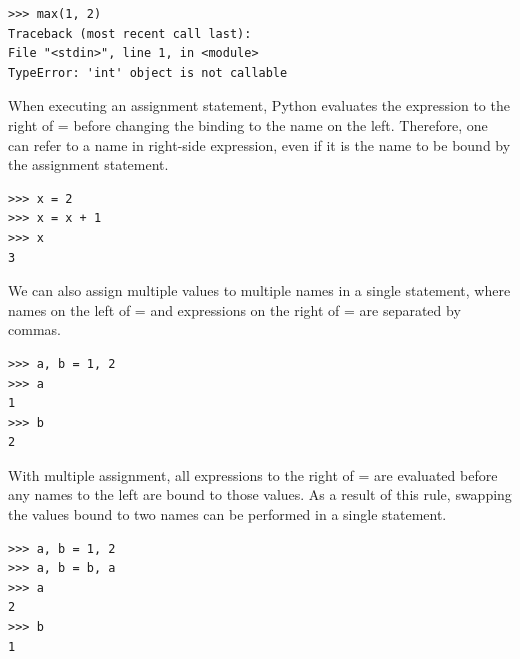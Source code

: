 \documentclass[11pt]{article}
\begin{document}
\begin{lstlisting}
>>> max(1, 2)
Traceback (most recent call last):
File "<stdin>", line 1, in <module>
TypeError: 'int' object is not callable 
\end{lstlisting}
When executing an assignment statement, Python evaluates the expression to the right of = before changing the binding to the name on the left. Therefore, one can refer to a name in right-side expression, even if it is the name to be bound by the assignment statement. 
\begin{lstlisting}
>>> x = 2
>>> x = x + 1
>>> x 
3
\end{lstlisting} 
We can also assign multiple values to multiple names in a single statement, where names on the left of = and expressions on the right of = are separated by commas. 
\begin{lstlisting}
>>> a, b = 1, 2
>>> a 
1 
>>> b
2
\end{lstlisting}
With multiple assignment, all expressions to the right of = are evaluated before any names to the left are bound to those values. As a result of this rule, swapping the values bound to two names can be performed in a single statement.
\begin{lstlisting}
>>> a, b = 1, 2
>>> a, b = b, a
>>> a 
2
>>> b
1
\end{lstlisting} 
\end{document}
